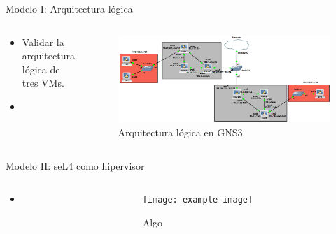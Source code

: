 \documentclass[serif, aspectratio=169]{beamer}
\begin{document}
\begin{frame}{Modelo I: Arquitectura lógica}
    \begin{columns}
        \begin{column}{0.4\textwidth}
            \begin{itemize}
                \item Validar la arquitectura lógica de tres VMs.
                \item 
            \end{itemize}
        \end{column}
        \begin{column}{0.6\textwidth}
            \begin{figure}
                \centering
                \includegraphics[width=\textwidth]{images/gns3_2.png}
                \caption{Arquitectura lógica en GNS3.}
            \end{figure}
        \end{column}
    \end{columns}
\end{frame}

\begin{frame}{Modelo II: seL4 como hipervisor}
    \begin{columns}
        \begin{column}{0.4\textwidth}
            \begin{itemize}
                \item
            \end{itemize}
        \end{column}
        \begin{column}{0.6\textwidth}
            \begin{figure}
                \centering
                \texttt{[image: example-image]}
                \caption{Algo}
            \end{figure}
        \end{column}
    \end{columns}
\end{frame}
\end{document}
